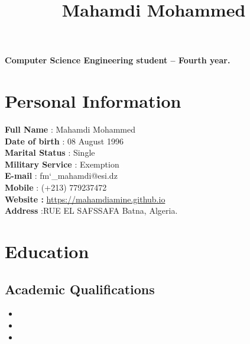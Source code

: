 \documentclass[12pt,a4paper,sans]{moderncv}
\title{Mahamdi Mohammed }
\begin{document}
	\makecvtitle
	\textbf{Computer Science Engineering student  – Fourth year.}
	\section{ Personal Information}
	\vspace{3ex}
	\textbf{Full Name}	        : Mahamdi Mohammed\\
	\textbf{Date of birth }		: 08 August 1996\\
	\textbf{Marital Status}		: Single\\
	\textbf{Military Service}	: Exemption\\
	\textbf{E-mail}				: fm\char`_mahamdi@esi.dz\\
	\textbf{Mobile}		: (+213) 779237472\\
	\textbf{Website :}  \href{https://mahamdiamine.github.io}
						{https://mahamdiamine.github.io}\\
	\textbf{Address}			:RUE EL SAFSSAFA Batna, Algeria. 
	\section{Education}
	
	\subsection{Academic Qualifications}
	\vspace{1.5 ex}
	\begin{itemize}
		
		\item{}
		
		\item{} 
		
		\item{} 
		
	\end{itemize}
	
\end{document}
